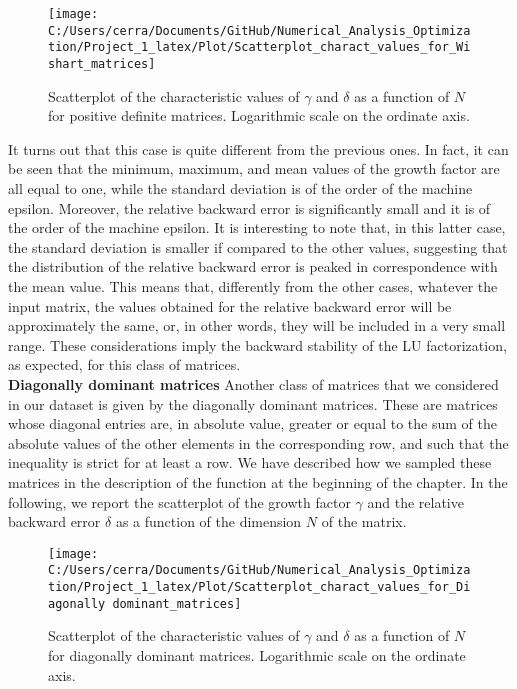 \documentclass[a4paper,11pt]{article}
\begin{document}
\begin{figure}[H]
	\centering
	\texttt{[image: C:/Users/cerra/Documents/GitHub/Numerical\_Analysis\_Optimization/Project\_1\_latex/Plot/Scatterplot\_charact\_values\_for\_Wishart\_matrices]}
	\caption{Scatterplot of the characteristic values of $\gamma$ and $\delta$ as a function of $N$ for positive definite matrices. Logarithmic scale on the ordinate axis.}
	\label{fig:Scatterplot_Wishart}
\end{figure}

\noindent It turns out that this case is quite different from the previous ones. In fact, it can be seen that the minimum, maximum, and mean values of the growth factor are all equal to one, while the standard deviation is of the order of the machine epsilon. Moreover, the relative backward error is significantly small and it is of the order of the machine epsilon. It is interesting to note that, in this latter case, the standard deviation is smaller if compared to the other values, suggesting that the distribution of the relative backward error is peaked in correspondence with the mean value. This means that, differently from the other cases, whatever the input matrix, the values obtained for the relative backward error will be approximately the same, or, in other words, they will be included in a very small range. These considerations imply the backward stability of the LU factorization, as expected, for this class of matrices.\\

\noindent \textbf{Diagonally dominant matrices } Another class of matrices that we considered in our dataset is given by the diagonally dominant matrices. These are matrices whose diagonal entries are, in absolute value, greater or equal to the sum of the absolute values of the other elements in the corresponding row, and such that the inequality is strict for at least a row. We have described how we sampled these matrices in the description of the function at the beginning of the chapter. In the following, we report the scatterplot of the growth factor $\gamma$ and the relative backward error $\delta$ as a function of the dimension $N$ of the matrix.

\begin{figure}[H]
	\centering
	\texttt{[image: C:/Users/cerra/Documents/GitHub/Numerical\_Analysis\_Optimization/Project\_1\_latex/Plot/Scatterplot\_charact\_values\_for\_Diagonally dominant\_matrices]}
	\caption{Scatterplot of the characteristic values of $\gamma$ and $\delta$ as a function of $N$ for diagonally dominant matrices. Logarithmic scale on the ordinate axis.}
	\label{fig:Scatterplot_Diag_dom}
\end{figure}
\end{document}

